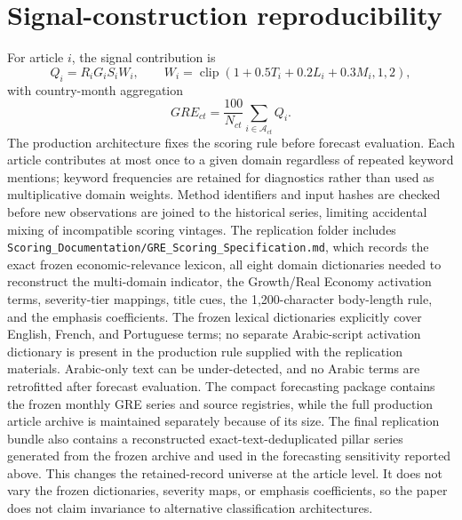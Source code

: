 \documentclass[12pt]{article}
\begin{document}
\section{Signal-construction reproducibility}
For article $i$, the signal contribution is
\[
Q_i=R_iG_iS_iW_i,
\qquad
W_i=\operatorname{clip}(1+0.5T_i+0.2L_i+0.3M_i,1,2),
\]
with country-month aggregation
\[
GRE_{ct}=\frac{100}{N_{ct}}\sum_{i\in\mathcal A_{ct}}Q_i.
\]
The production architecture fixes the scoring rule before forecast evaluation. Each article contributes at most once to a given domain regardless of repeated keyword mentions; keyword frequencies are retained for diagnostics rather than used as multiplicative domain weights. Method identifiers and input hashes are checked before new observations are joined to the historical series, limiting accidental mixing of incompatible scoring vintages. The replication folder includes \texttt{Scoring\_Documentation/GRE\_Scoring\_Specification.md}, which records the exact frozen economic-relevance lexicon, all eight domain dictionaries needed to reconstruct the multi-domain indicator, the Growth/Real Economy activation terms, severity-tier mappings, title cues, the 1,200-character body-length rule, and the emphasis coefficients. The frozen lexical dictionaries explicitly cover English, French, and Portuguese terms; no separate Arabic-script activation dictionary is present in the production rule supplied with the replication materials. Arabic-only text can be under-detected, and no Arabic terms are retrofitted after forecast evaluation. The compact forecasting package contains the frozen monthly GRE series and source registries, while the full production article archive is maintained separately because of its size. The final replication bundle also contains a reconstructed exact-text-deduplicated pillar series generated from the frozen archive and used in the forecasting sensitivity reported above. This changes the retained-record universe at the article level. It does not vary the frozen dictionaries, severity maps, or emphasis coefficients, so the paper does not claim invariance to alternative classification architectures.
\end{document}
